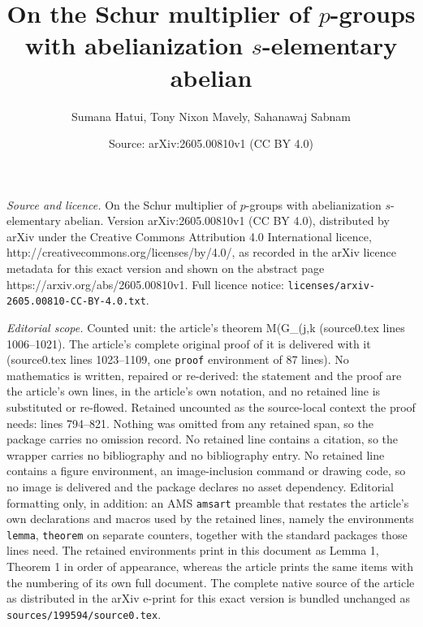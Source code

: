 \documentclass[10pt,a4paper]{amsart}
\title{On the Schur multiplier of $p$-groups with abelianization $s$-elementary abelian}
\author{Sumana Hatui, Tony Nixon Mavely, Sahanawaj Sabnam}
\date{Source: arXiv:2605.00810v1 (CC BY 4.0)}
\begin{document}
\maketitle

\noindent\emph{Source and licence.} On the Schur multiplier of $p$-groups with abelianization $s$-elementary abelian. Version arXiv:2605.00810v1 (CC BY 4.0), distributed by arXiv under the Creative Commons Attribution 4.0 International licence, http://creativecommons.org/licenses/by/4.0/, as recorded in the arXiv licence metadata for this exact version and shown on the abstract page https://arxiv.org/abs/2605.00810v1. Full licence notice: \texttt{licenses/arxiv-2605.00810-CC-BY-4.0.txt}.\par\smallskip

\noindent\textit{Editorial scope.} Counted unit: the article's theorem M(G\_(j,k (source0.tex lines 1006--1021). The article's complete original proof of it is delivered with it (source0.tex lines 1023--1109, one \texttt{proof} environment of 87 lines). No mathematics is written, repaired or re-derived: the statement and the proof are the article's own lines, in the article's own notation, and no retained line is substituted or re-flowed.  Retained uncounted as the source-local context the proof needs: lines 794--821.  Nothing was omitted from any retained span, so the package carries no omission record.  No retained line contains a citation, so the wrapper carries no bibliography and no bibliography entry.  No retained line contains a figure environment, an image-inclusion command or drawing code, so no image is delivered and the package declares no asset dependency.  Editorial formatting only, in addition: an AMS \texttt{amsart} preamble that restates the article's own declarations and macros used by the retained lines, namely the environments \texttt{lemma}, \texttt{theorem} on separate counters, together with the standard packages those lines need.  The retained environments print in this document as Lemma 1, Theorem 1 in order of appearance, whereas the article prints the same items with the numbering of its own full document.  The complete native source of the article as distributed in the arXiv e-print for this exact version is bundled unchanged as \texttt{sources/199594/source0.tex}.
\end{document}
